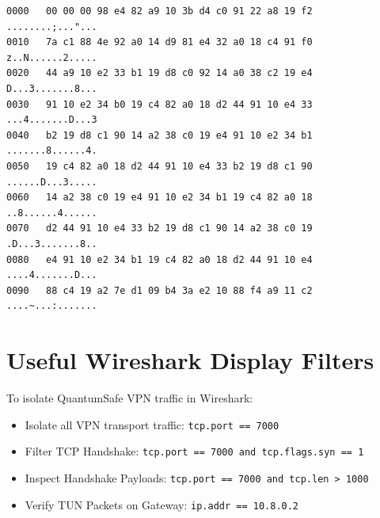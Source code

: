 \begin{lstlisting}[basicstyle=\ttfamily\scriptsize, caption={Raw Hex Trace of Live Encapsulated Data Frame.}]
0000   00 00 00 98 e4 82 a9 10 3b d4 c0 91 22 a8 19 f2  ........;..."...
0010   7a c1 88 4e 92 a0 14 d9 81 e4 32 a0 18 c4 91 f0  z..N......2.....
0020   44 a9 10 e2 33 b1 19 d8 c0 92 14 a0 38 c2 19 e4  D...3.......8...
0030   91 10 e2 34 b0 19 c4 82 a0 18 d2 44 91 10 e4 33  ...4.......D...3
0040   b2 19 d8 c1 90 14 a2 38 c0 19 e4 91 10 e2 34 b1  .......8......4.
0050   19 c4 82 a0 18 d2 44 91 10 e4 33 b2 19 d8 c1 90  ......D...3.....
0060   14 a2 38 c0 19 e4 91 10 e2 34 b1 19 c4 82 a0 18  ..8......4......
0070   d2 44 91 10 e4 33 b2 19 d8 c1 90 14 a2 38 c0 19  .D...3.......8..
0080   e4 91 10 e2 34 b1 19 c4 82 a0 18 d2 44 91 10 e4  ....4.......D...
0090   88 c4 19 a2 7e d1 09 b4 3a e2 10 88 f4 a9 11 c2  ....~...:.......
\end{lstlisting}

\section{Useful Wireshark Display Filters}
To isolate QuantumSafe VPN traffic in Wireshark:
\begin{itemize}
    \item Isolate all VPN transport traffic: \texttt{tcp.port == 7000}
    \item Filter TCP Handshake: \texttt{tcp.port == 7000 and tcp.flags.syn == 1}
    \item Inspect Handshake Payloads: \texttt{tcp.port == 7000 and tcp.len > 1000}
    \item Verify TUN Packets on Gateway: \texttt{ip.addr == 10.8.0.2}
\end{itemize}

